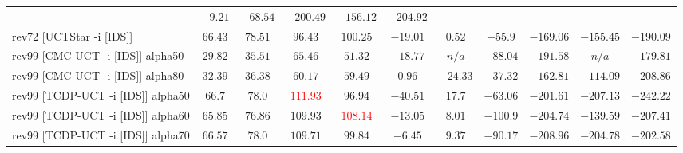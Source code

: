 \documentclass{article}
\begin{document}
\begin{tabular}{|l|r@{$\pm$}rr@{$\pm$}rr@{$\pm$}rr@{$\pm$}rr@{$\pm$}rr@{$\pm$}rr@{$\pm$}rr@{$\pm$}rr@{$\pm$}rr@{$\pm$}r|}
& \multicolumn{2}{c}{$-9.21$}
& \multicolumn{2}{c}{$-68.54$}
& \multicolumn{2}{c}{$-200.49$}
& \multicolumn{2}{c}{$-156.12$}
& \multicolumn{2}{c|}{$-204.92$}
\\
rev72 [UCTStar -i [IDS]]
& \multicolumn{2}{c}{$66.43$}
& \multicolumn{2}{c}{$78.51$}
& \multicolumn{2}{c}{$96.43$}
& \multicolumn{2}{c}{$100.25$}
& \multicolumn{2}{c}{$-19.01$}
& \multicolumn{2}{c}{$0.52$}
& \multicolumn{2}{c}{$-55.9$}
& \multicolumn{2}{c}{$-169.06$}
& \multicolumn{2}{c}{$-155.45$}
& \multicolumn{2}{c|}{$-190.09$}
\\
\hline
rev99 [CMC-UCT -i [IDS]] alpha50
& \multicolumn{2}{c}{$29.82$}
& \multicolumn{2}{c}{$35.51$}
& \multicolumn{2}{c}{$65.46$}
& \multicolumn{2}{c}{$51.32$}
& \multicolumn{2}{c}{$-18.77$}
& \multicolumn{2}{c}{\textbf{$n/a$}}
& \multicolumn{2}{c}{$-88.04$}
& \multicolumn{2}{c}{$-191.58$}
& \multicolumn{2}{c}{\textbf{$n/a$}}
& \multicolumn{2}{c|}{\textbf{$-179.81$}}
\\
rev99 [CMC-UCT -i [IDS]] alpha80
& \multicolumn{2}{c}{$32.39$}
& \multicolumn{2}{c}{$36.38$}
& \multicolumn{2}{c}{$60.17$}
& \multicolumn{2}{c}{$59.49$}
& \multicolumn{2}{c}{$0.96$}
& \multicolumn{2}{c}{$-24.33$}
& \multicolumn{2}{c}{\textbf{$-37.32$}}
& \multicolumn{2}{c}{$-162.81$}
& \multicolumn{2}{c}{$-114.09$}
& \multicolumn{2}{c|}{$-208.86$}
\\
rev99 [TCDP-UCT -i [IDS]] alpha50
& \multicolumn{2}{c}{\textbf{$66.7$}}
& \multicolumn{2}{c}{\textbf{$78.0$}}
& \multicolumn{2}{c}{\textbf{\textcolor{red}{$111.93$}}}
& \multicolumn{2}{c}{$96.94$}
& \multicolumn{2}{c}{$-40.51$}
& \multicolumn{2}{c}{$17.7$}
& \multicolumn{2}{c}{$-63.06$}
& \multicolumn{2}{c}{$-201.61$}
& \multicolumn{2}{c}{$-207.13$}
& \multicolumn{2}{c|}{$-242.22$}
\\
rev99 [TCDP-UCT -i [IDS]] alpha60
& \multicolumn{2}{c}{\textbf{$65.85$}}
& \multicolumn{2}{c}{$76.86$}
& \multicolumn{2}{c}{\textbf{$109.93$}}
& \multicolumn{2}{c}{\textbf{\textcolor{red}{$108.14$}}}
& \multicolumn{2}{c}{$-13.05$}
& \multicolumn{2}{c}{$8.01$}
& \multicolumn{2}{c}{$-100.9$}
& \multicolumn{2}{c}{$-204.74$}
& \multicolumn{2}{c}{$-139.59$}
& \multicolumn{2}{c|}{$-207.41$}
\\
rev99 [TCDP-UCT -i [IDS]] alpha70
& \multicolumn{2}{c}{\textbf{$66.57$}}
& \multicolumn{2}{c}{\textbf{$78.0$}}
& \multicolumn{2}{c}{\textbf{$109.71$}}
& \multicolumn{2}{c}{\textbf{$99.84$}}
& \multicolumn{2}{c}{$-6.45$}
& \multicolumn{2}{c}{$9.37$}
& \multicolumn{2}{c}{$-90.17$}
& \multicolumn{2}{c}{$-208.96$}
& \multicolumn{2}{c}{$-204.78$}
& \multicolumn{2}{c|}{$-202.58$}

\end{tabular}
\end{document}
